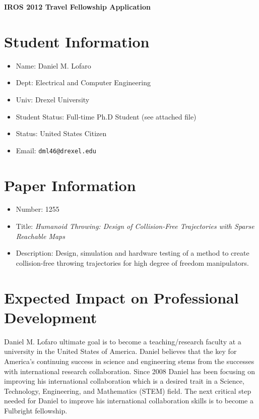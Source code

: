 \documentclass[11pt,a4paper,oneside]{report}
\begin{document}
\begin{center}
\LARGE{ \bf IROS 2012 Travel Fellowship Application }
\end{center}

\section*{Student Information}
\begin{itemize}
\item Name: Daniel M. Lofaro
\item Dept: Electrical and Computer Engineering
\item Univ: Drexel University
\item Student Status: Full-time Ph.D Student (see attached file)
\item Status: United States Citizen
\item Email: \tt{dml46@drexel.edu}
\end{itemize}


\section*{Paper Information}
\begin{itemize}
\item Number: 1255
\item Title: \textit{Humanoid Throwing: Design of Collision-Free Trajectories with Sparse Reachable Maps}
\item Description: Design, simulation and hardware testing of a method to create collision-free throwing trajectories for high degree of freedom manipulators. 
\end{itemize}


\section*{Expected Impact on Professional Development}
Daniel M. Lofaro ultimate goal is to become a teaching/research faculty at a university in the United States of America.  
Daniel believes that the key for America's continuing success in science and engineering stems from the successes with international research collaboration.
Since 2008 Daniel has been focusing on improving his international collaboration which is a desired trait in a Science, Technology, Engineering, and Mathematics (STEM) field.
The next critical step needed for Daniel to improve his international collaboration skills is to become a Fulbright fellowship.
\end{document}

